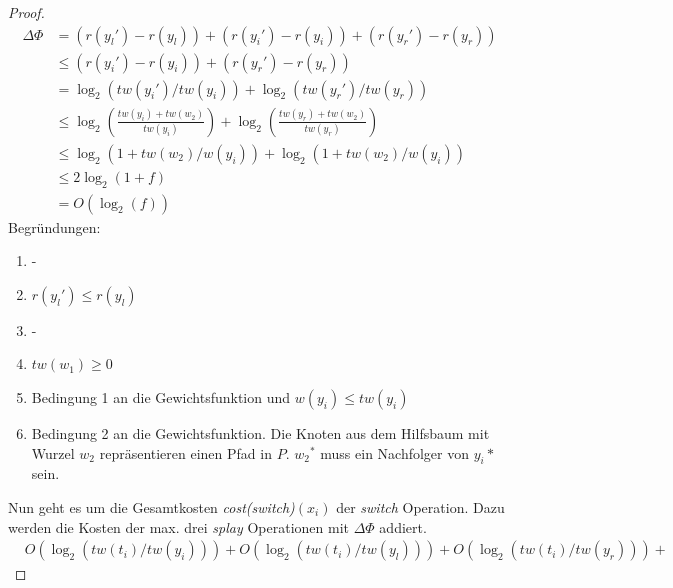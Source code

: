 \documentclass[a4paper,12pt]{article}
\begin{document}
\begin{proof}
\begin{align}
	\Delta \Phi &= \left( r\left({y_l}'\right) - r\left({y_l}\right)\right) + \left( r\left({y_i}'\right) - r\left({y_i}\right)\right) + \left( r\left({y_r}'\right) - r\left({y_r}\right)\right)\\
	&\leq   \left( r\left({y_i}'\right) - r\left({y_i}\right)\right) +  \left( r\left({y_r}'\right) - r\left({y_r}\right)\right)\\
	&=\log_2\left( \mathit{tw}\left({y_i}'\right)  / \mathit{tw}\left({y_i}\right)  \right) + \log_2\left( \mathit{tw}\left({y_r}'\right)  / \mathit{tw}\left({y_r}\right)  \right) \\
	&\leq	\log_2\left(\frac{\mathit{tw}\left({y_i}\right) + \mathit{tw}\left({w_2} \right)  }{\mathit{tw}\left({y_i}\right)}   \right) + \log_2\left( \frac{\mathit{tw}\left({y_r}\right) + \mathit{tw}\left({w_2} \right)}{\mathit{tw}\left({y_r}\right)} 	  \right) \\
	&\leq \log_2\left( 1 + \mathit{tw}\left({w_2}  	\right) / \mathit{w}\left({y_i}\right) \right)  +
	\log_2 \left(1 + \mathit{tw}\left({w_2}   	\right) / \mathit{w}\left({y_i}\right) \right)  \\
	&\leq 2 \log_2 \left(1 + f\right)\\
	&= O\left(\log_2 \left(f\right)\right)
\end{align}
Begründungen:
\begin{enumerate}
	\item -
	\item $ r\left({y_l}'\right) \leq r\left({y_l}\right)$
	\item -
	\item $\mathit{tw}\left({w_1}\right) \geq 0$
	\item Bedingung 1 an die Gewichtsfunktion und $w\left(y_i\right) \leq \mathit{tw}\left(y_i\right)$
	\item Bedingung 2 an die Gewichtsfunktion. Die Knoten aus dem Hilfsbaum mit Wurzel $w_2$ repräsentieren einen Pfad in $P$. ${w_2}^*$ muss ein Nachfolger von ${y_i}*$ sein.
\end{enumerate}	
Nun geht es um die Gesamtkosten \textit{cost(switch)}$\left(x_i\right)$ der \textit{switch} Operation. Dazu werden die Kosten der max. drei \textit{splay} Operationen mit $\Delta \Phi$ addiert.
\begin{align*}
&O\left(\log_2 \left(\mathit{tw}\left(t_i\right) /  \mathit{tw}\left(y_i\right)  \right) \right) +
O\left(\log_2 \left(\mathit{tw}\left(t_i\right) /  \mathit{tw}\left(y_l\right)  \right) \right) + O\left(\log_2 \left(\mathit{tw}\left(t_i\right) /  \mathit{tw}\left(y_r\right)  \right) \right) +

\end{align*}
\end{proof}
\end{document}
